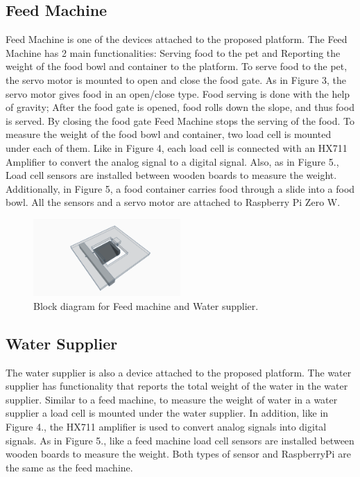 \documentclass[conference]{IEEEtran}
\begin{document}
\subsection{Feed Machine}
Feed Machine is one of the devices attached to the proposed platform. The Feed Machine has 2 main functionalities: Serving food to the pet and Reporting the weight of the food bowl and container to the platform. To serve food to the pet, the servo motor is mounted to open and close the food gate. As in Figure 3, the servo motor gives food in an open/close type. Food serving is done with the help of gravity; After the food gate is opened, food rolls down the slope, and thus food is served. By closing the food gate Feed Machine stops the serving of the food. To measure the weight of the food bowl and container, two load cell is mounted under each of them. Like in Figure 4, each load cell is connected with an HX711 Amplifier to convert the analog signal to a digital signal. Also, as in Figure 5., Load cell sensors are installed between wooden boards to measure the weight. Additionally, in Figure 5, a food container carries food through a slide into a food bowl. All the sensors and a servo motor are attached to Raspberry Pi Zero W.

\begin{figure}[htbp]
\centerline{\includegraphics[width=0.5\textwidth]{./images/servo_gate.png}}
\caption{Block diagram for Feed machine and Water supplier.}
\label{fig}
\end{figure}

\subsection{Water Supplier}
The water supplier is also a device attached to the proposed platform.
The water supplier has functionality that reports the total weight of the water in the water supplier.
Similar to a feed machine, to measure the weight of water in a water supplier a load cell is mounted under the water supplier. In addition, like in Figure 4., the HX711 amplifier is used to convert analog signals into digital signals. As in Figure 5., like a feed machine load cell sensors are installed between wooden boards to measure the weight. Both types of sensor and RaspberryPi are the same as the feed machine. 
\end{document}
